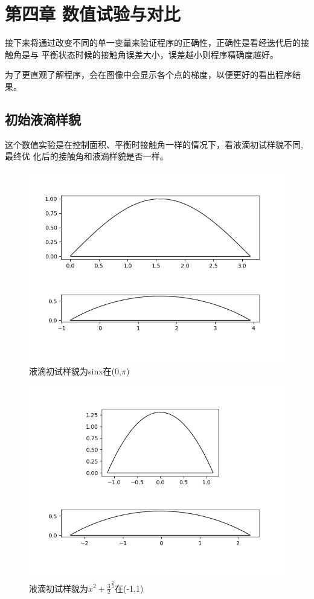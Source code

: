 \documentclass[12pt,oneside,a4paper]{article}
\begin{document}
\section{第四章 数值试验与对比}
接下来将通过改变不同的单一变量来验证程序的正确性，正确性是看经迭代后的接触角是与
平衡状态时候的接触角误差大小，误差越小则程序精确度越好。

为了更直观了解程序，会在图像中会显示各个点的梯度，以便更好的看出程序结果。
\subsection{初始液滴样貌}
这个数值实验是在控制面积、平衡时接触角一样的情况下，看液滴初试样貌不同,最终优
化后的接触角和液滴样貌是否一样。
\begin{figure}[H]
	\centering
	\includegraphics[width=0.6\linewidth]{figure/area1.png}
	\caption{液滴初试样貌为sinx在(0,$\pi$)}
	\label{fig:6}
\end{figure}
\begin{figure}[H]
	\centering
	\includegraphics[width=0.6\linewidth]{figure/area2.png}
	\caption{液滴初试样貌为$x^2+\frac{3}{2}^\frac{2}{3}$在(-1,1)}
	\label{fig:7}
\end{figure}
\end{document}
